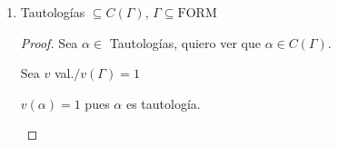 \begin{enumerate}
\begin{enumerate}
\begin{proof}
        \begin{itemize}
            \item $\subseteq$) Es trivial por definición.
            \item $\supseteq$) Supongo
                $\exists \; \alpha \in \mathrm{FORM} / \alpha \notin C(\Gamma)$
                \begin{gather*}
                    \exists \; v \text{ valuación}/v(\alpha)=0 
                    \text{ y } \overbrace{v(\Gamma) = 1}^{\text{¡Absurdo!}}
                \end{gather*}

                \medskip

                $V(\Gamma)=1$ es absurdo pues $\Gamma$ es insatisfacible.

                El mismo vino de suponer que había una fórmula que no está
                en las consecuencias de $\Gamma$.
        \end{itemize}

        De esta manera probamos que $C(\Gamma)$ son todas las fórmulas.

        \end{proof}

        \bigskip

        Otra manera:
        \begin{proof} \phantom{.}
        
            Sea $v$ valuación.

            \begin{gather*}
                \underbrace{(\underbrace{v(\Gamma) = 1}_{\text{Falso}}
                \implies v(\alpha) = 1)}_{\text{Verdadero}}
            \end{gather*}
        \end{proof}

    \item Tautologías $\subseteq C(\Gamma)$, $\Gamma \subseteq \mathrm{FORM}$

    \begin{proof} \phantom{.}
    
        Sea $\alpha \in$ Tautologías, quiero ver que $\alpha \in C(\Gamma)$.

        Sea $v$ val.$/v(\Gamma) = 1$

        \begin{center}
            $v(\alpha)=1$ pues $\alpha$ es tautología.
        \end{center}
    \end{proof}
\end{enumerate}

\end{enumerate}

